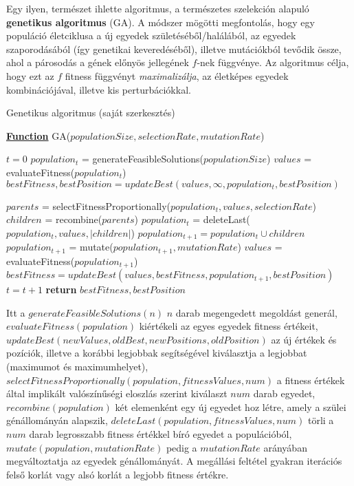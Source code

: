 Egy ilyen, természet ihlette algoritmus, a természetes szelekción alapuló \textbf{genetikus algoritmus} (GA)\cite{genetic_algorithm, non_gradient_optimization}. A módszer mögötti megfontolás, hogy egy populáció életciklusa a új egyedek születéséből/halálából, az egyedek szaporodásából (így genetikai keveredéséből), illetve mutációkból tevődik össze, ahol a párosodás a gének előnyös jellegének $f$-nek függvénye. Az algoritmus célja, hogy ezt az $f$ fitness függvényt \textit{maximalizálja}, az életképes egyedek kombinációjával, illetve kis perturbációkkal.

\begin{algorithm}[H]
\caption{Genetikus algoritmus (saját szerkesztés)}
\label{alg:ga} 
\textbf{\underline{Function}} GA($populationSize, selectionRate, mutationRate$)
\begin{algorithmic}[1] %
\STATE $t = 0$
\STATE $population_t$ = generateFeasibleSolutions($populationSize$)
\STATE $values$ = evaluateFitness($population_t$)
\STATE $bestFitness, bestPosition = updateBest(values, \infty, population_t, bestPosition)$
\end{algorithmic}
\end{algorithm}

\begin{algorithm}[H]
\begin{algorithmic}[1] %
	\STATE $parents$ = selectFitnessProportionally($population_t, values, selectionRate$)
	\STATE $children$ = recombine($parents$)
	\STATE $population_t$ = deleteLast($population_t, values, |children|$)
	\STATE $population_{t+1} = population_t \cup children$
	\STATE $population_{t+1}$ = mutate($population_{t+1}, mutationRate$)
	\STATE $values$ = evaluateFitness($population_{t+1}$)
	\STATE $bestFitness = updateBest(values, bestFitness, population_{t+1}, bestPosition)$
	\STATE $t = t + 1$
\ENDWHILE
\STATE \textbf{return} $bestFitness, bestPosition$
\end{algorithmic}
\end{algorithm}


Itt a $generateFeasibleSolutions(n)$ $n$ darab megengedett megoldást generál, $evaluateFitness(population)$ kiértékeli az egyes egyedek fitness értékeit, $updateBest(newValues, oldBest, newPositions, oldPosition)$ az új értékek és pozíciók, illetve a korábbi legjobbak segítségével kiválasztja a legjobbat (maximumot és maximumhelyet), $selectFitnessProportionally(population, fitnessValues, num)$ a fitness értékek által implikált valószínűségi eloszlás szerint kiválaszt $num$ darab egyedet, $recombine(population)$ két elemenként egy új egyedet hoz létre, amely a szülei génállományán alapszik, $deleteLast(population, fitnessValues, num)$ törli a $num$ darab legrosszabb fitness értékkel bíró egyedet a populációból, $mutate(population, mutationRate)$ pedig a $mutationRate$ arányában megváltoztatja az egyedek génállományát. A megállási feltétel gyakran iterációs felső korlát vagy alsó korlát a legjobb fitness értékre.



